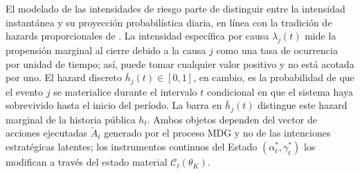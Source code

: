 \documentclass[pdflatex,sn-mathphys-ay]{sn-jnl}
\theoremstyle{thmstyleone}
\theoremstyle{thmstyletwo}
\theoremstyle{thmstylethree}
\newcommand{\1}{\mathbf{1}}
\begin{document}
El modelado de las intensidades de riesgo parte de distinguir entre la intensidad instantánea y su proyección probabilística diaria, en línea con la tradición de hazards proporcionales de \citet{Cox1972}. La intensidad específica por causa $\lambda_j(t)$ mide la propensión marginal al cierre debido a la causa $j$ como una tasa de ocurrencia por unidad de tiempo; así, puede tomar cualquier valor positivo y no está acotada por uno. El hazard discreto $\bar h_j(t)\in[0,1]$, en cambio, es la probabilidad de que el evento $j$ se materialice durante el intervalo $t$ condicional en que el sistema haya sobrevivido hasta el inicio del período. La barra en $\bar h_j(t)$ distingue este hazard marginal de la historia pública $h_t$. Ambos objetos dependen del vector de acciones ejecutadas $\tilde{A}_t$ generado por el proceso MDG y no de las intenciones estratégicas latentes; los instrumentos continuos del Estado $(\alpha_t^\ast,\gamma_t^\ast)$ los modifican a través del estado material $\mathcal{C}_t(\theta_K)$.
\end{document}
